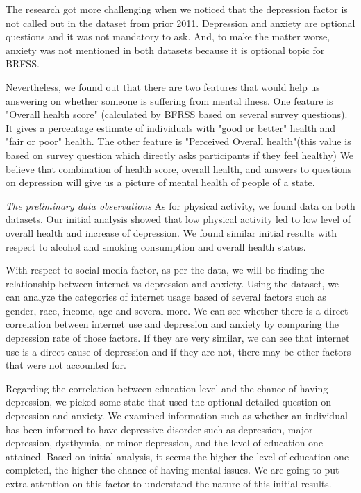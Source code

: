 \documentclass[letterpaper, 10 pt, conference]{ieeeconf}  %
\begin{document}
The research got more challenging when we noticed that 
the depression factor is not called out in the dataset from prior 2011. 
Depression and anxiety are optional questions and it was not mandatory to ask.
And, to make the matter worse, anxiety 
was not mentioned in both datasets because it is optional topic for BRFSS. 

Nevertheless, we found out that there are two features that would help us
answering on whether someone is suffering from mental ilness. 
One feature is "Overall health score" (calculated by BFRSS based on several survey questions). 
It gives a percentage estimate of individuals with "good or better" health and "fair or poor" health.
The other feature is "Perceived Overall health"(this value is based on survey question which directly 
asks participants if they feel healthy)
We believe that combination of health score, overall health, and answers to questions on depression will 
give us a picture of mental health of people of a state. 

\par\noindent\textit{The preliminary data observations}\newline\newline
As for physical activity, we found data on both datasets. Our initial analysis 
showed that low physical activity led to low level of overall health and increase of depression. We found similar 
initial results with respect to alcohol and smoking consumption and overall health status.  

With respect to social media factor, as per the data, we will be finding the relationship between internet vs 
depression and anxiety. Using the dataset, we can analyze the categories of internet usage based of several 
factors such as gender, race, income, age and several more. We can see whether there is a direct correlation 
between internet use and depression and anxiety by comparing the depression rate of those factors. If they are 
very similar, we can see that internet use is a direct cause of depression and if they are not, there may be 
other factors that were not accounted for.

Regarding the correlation between education level and the chance of having depression, we picked some state 
that used the optional detailed question on depression and anxiety.  
We examined information such as whether an individual has been informed to have 
depressive disorder such as depression, major depression, dysthymia, or minor depression, and the level of 
education one attained. Based on initial analysis, it seems the higher the level of education one completed, 
the higher the chance of having mental issues. We are going to put extra attention on this factor to understand 
the nature of this initial results.
\end{document}
